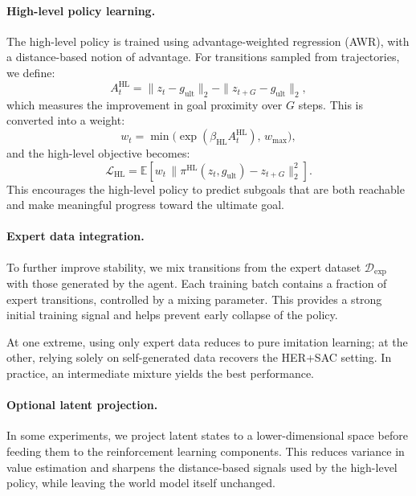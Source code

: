 \paragraph{High-level policy learning.}
The high-level policy is trained using advantage-weighted regression
(AWR), with a distance-based notion of advantage. For transitions sampled
from trajectories, we define:
\begin{equation}
A_t^{\mathrm{HL}} =
\|z_t - g_{\mathrm{ult}}\|_2 - \|z_{t+G} - g_{\mathrm{ult}}\|_2,
\end{equation}
which measures the improvement in goal proximity over $G$ steps. This is
converted into a weight:
\begin{equation}
w_t = \min\!\big(\exp(\beta_{\mathrm{HL}} A_t^{\mathrm{HL}}),\, w_{\max}\big),
\end{equation}
and the high-level objective becomes:
\begin{equation}
\mathcal{L}_{\mathrm{HL}} =
\mathbb{E}\!\left[
w_t \,\big\|\pi^{\mathrm{HL}}(z_t, g_{\mathrm{ult}}) - z_{t+G}\big\|_2^2
\right].
\end{equation}
This encourages the high-level policy to predict subgoals that are both
reachable and make meaningful progress toward the ultimate goal.

\paragraph{Expert data integration.}
To further improve stability, we mix transitions from the expert dataset
$\mathcal{D}_{\mathrm{exp}}$ with those generated by the agent. Each
training batch contains a fraction of expert transitions, controlled by
a mixing parameter. This provides a strong initial training signal and
helps prevent early collapse of the policy.

At one extreme, using only expert data reduces to pure imitation
learning; at the other, relying solely on self-generated data recovers
the HER+SAC setting. In practice, an intermediate mixture yields the best
performance.

\paragraph{Optional latent projection.}
In some experiments, we project latent states to a lower-dimensional
space before feeding them to the reinforcement learning components. This
reduces variance in value estimation and sharpens the distance-based
signals used by the high-level policy, while leaving the world model
itself unchanged.

